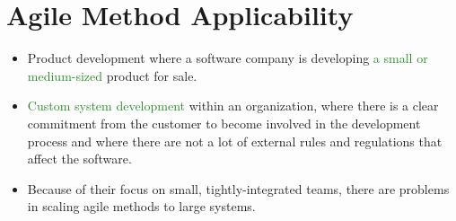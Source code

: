 \documentclass{report}
\newcommand{\textg}[1]{\textcolor{ForestGreen}{#1}}
\begin{document}
\newpage
\section{Agile Method Applicability}
\begin{itemize}
  \item Product development where a software company is developing \textg{a small or medium-sized} product for sale.
  \item \textg{Custom system development} within an organization, where there is a clear commitment from the customer to become involved in the development process and where there are not a lot of external rules and regulations that affect the software.
  \item Because of their focus on small, tightly-integrated teams, there are problems in scaling agile methods to large systems.
\end{itemize}  
  
\end{document}
